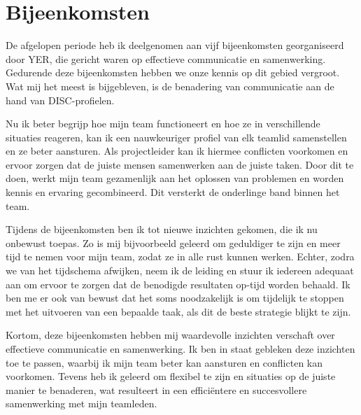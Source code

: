 \section{Bijeenkomsten}
De afgelopen periode heb ik deelgenomen aan vijf bijeenkomsten georganiseerd door \gls{YER}, die gericht waren op effectieve communicatie en samenwerking. Gedurende deze bijeenkomsten hebben we onze kennis op dit gebied vergroot. Wat mij het meest is bijgebleven, is de benadering van communicatie aan de hand van \gls{DISC}-profielen.

Nu ik beter begrijp hoe mijn team functioneert en hoe ze in verschillende situaties reageren, kan ik een nauwkeuriger profiel van elk teamlid samenstellen en ze beter aansturen. Als projectleider kan ik hiermee conflicten voorkomen en ervoor zorgen dat de juiste mensen samenwerken aan de juiste taken. Door dit te doen, werkt mijn team gezamenlijk aan het oplossen van problemen en worden kennis en ervaring gecombineerd. Dit versterkt de onderlinge band binnen het team.

Tijdens de bijeenkomsten ben ik tot nieuwe inzichten gekomen, die ik nu onbewust toepas. Zo is mij bijvoorbeeld geleerd om geduldiger te zijn en meer tijd te nemen voor mijn team, zodat ze in alle rust kunnen werken. Echter, zodra we van het tijdschema afwijken, neem ik de leiding en stuur ik iedereen adequaat aan om ervoor te zorgen dat de benodigde resultaten op-tijd worden behaald. Ik ben me er ook van bewust dat het soms noodzakelijk is om tijdelijk te stoppen met het uitvoeren van een bepaalde taak, als dit de beste strategie blijkt te zijn.

Kortom, deze bijeenkomsten hebben mij waardevolle inzichten verschaft over effectieve communicatie en samenwerking. Ik ben in staat gebleken deze inzichten toe te passen, waarbij ik mijn team beter kan aansturen en conflicten kan voorkomen. Tevens heb ik geleerd om flexibel te zijn en situaties op de juiste manier te benaderen, wat resulteert in een efficiëntere en succesvollere samenwerking met mijn teamleden.




